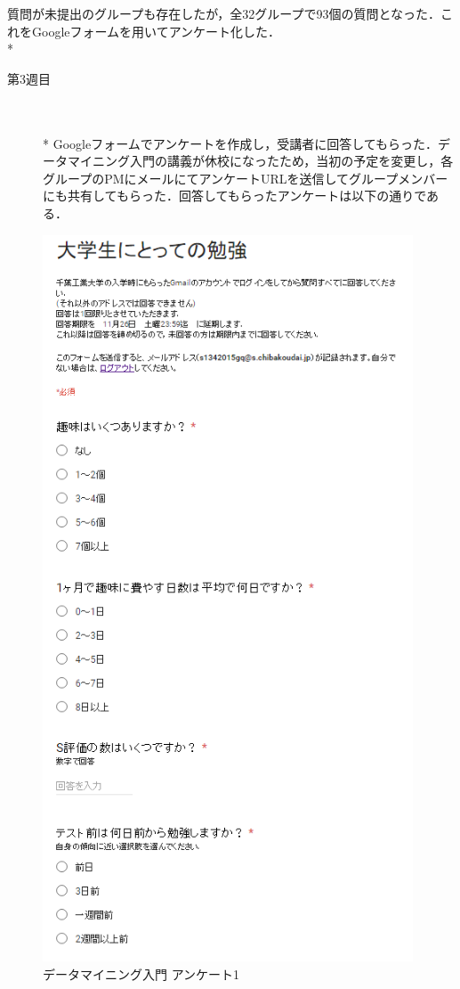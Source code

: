 質問が未提出のグループも存在したが，全32グループで93個の質問となった．これをGoogleフォームを用いてアンケート化した．  \vspace{0.1in} \\*


\begin{description}
 \item[第3週目]\mbox{}\\  \vspace{0.1in} \\*
	Googleフォームでアンケートを作成し，受講者に回答してもらった．データマイニング入門の講義が休校になったため，当初の予定を変更し，各グループのPMにメールにてアンケートURLを送信してグループメンバーにも共有してもらった．回答してもらったアンケートは以下の通りである．

\end{description}



\begin{figure}[p]
\centering
\includegraphics[width=11cm]{forms1.PNG}
\caption{データマイニング入門 アンケート1}\label{サンプル図}
\end{figure}

